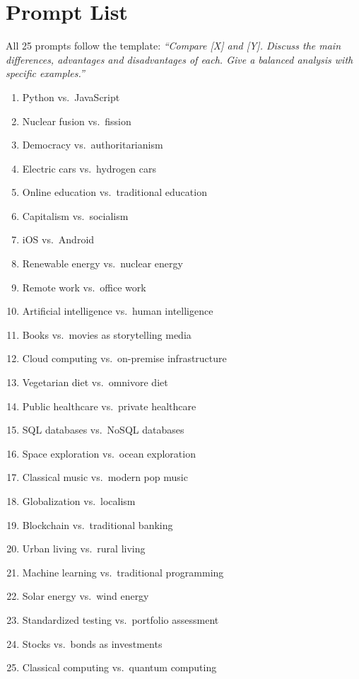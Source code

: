 \documentclass[11pt,twocolumn]{article}
\begin{document}
\appendix
\section{Prompt List}
\label{app:prompts}

All 25 prompts follow the template: \textit{``Compare [X] and [Y]. Discuss the main differences, advantages and disadvantages of each. Give a balanced analysis with specific examples.''}

\begin{enumerate}[nosep,label=\arabic*.]
\small
\item Python vs.\ JavaScript
\item Nuclear fusion vs.\ fission
\item Democracy vs.\ authoritarianism
\item Electric cars vs.\ hydrogen cars
\item Online education vs.\ traditional education
\item Capitalism vs.\ socialism
\item iOS vs.\ Android
\item Renewable energy vs.\ nuclear energy
\item Remote work vs.\ office work
\item Artificial intelligence vs.\ human intelligence
\item Books vs.\ movies as storytelling media
\item Cloud computing vs.\ on-premise infrastructure
\item Vegetarian diet vs.\ omnivore diet
\item Public healthcare vs.\ private healthcare
\item SQL databases vs.\ NoSQL databases
\item Space exploration vs.\ ocean exploration
\item Classical music vs.\ modern pop music
\item Globalization vs.\ localism
\item Blockchain vs.\ traditional banking
\item Urban living vs.\ rural living
\item Machine learning vs.\ traditional programming
\item Solar energy vs.\ wind energy
\item Standardized testing vs.\ portfolio assessment
\item Stocks vs.\ bonds as investments
\item Classical computing vs.\ quantum computing
\end{enumerate}
\end{document}
